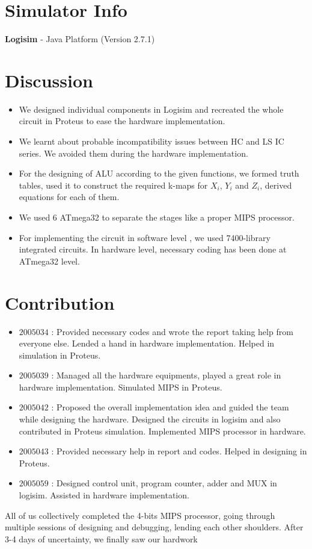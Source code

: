 \documentclass[a4paper]{article}
\begin{document}
\section{Simulator Info}
\textbf{Logisim} - Java Platform (Version 2.7.1)
\newpage
\section{Discussion}
\begin{itemize}
  \item We designed individual components in Logisim and recreated the whole circuit in Proteus to ease the hardware implementation.
  
  \item We learnt about probable incompatibility issues between HC and LS IC series. We avoided them during the hardware implementation.
  
  \item For the designing of ALU according to the given functions, we formed truth tables, used it to construct the required k-maps for $X_i$, $Y_i$ and $Z_i$, derived equations for each of them.

  \item We used 6 ATmega32 to separate the stages like a proper MIPS processor.
  \item For implementing the circuit in software level , we used 7400-library integrated circuits. In hardware level, necessary coding has been done at ATmega32 level.
  
\end{itemize}

\vspace{1cm}

\section{Contribution}
\begin{itemize}
    \item $2005034$ : Provided necessary codes and wrote the report taking help from everyone else. Lended a hand in hardware implementation. Helped in simulation in Proteus.
    
    \item $2005039$ : Managed all the hardware equipments, played a great role in hardware implementation. Simulated MIPS in Proteus.
    
    \item $2005042$ : Proposed the overall implementation idea and guided the team while designing the hardware. Designed the circuits in logisim and also contributed in Proteus simulation. Implemented MIPS processor in hardware.
    
    \item $2005043$ : Provided necessary help in report and codes. Helped in designing in Proteus.
    
    \item $2005059$ : Designed control unit, program counter, adder and MUX in logisim. Assisted in hardware implementation.
\end{itemize}


All of us collectively completed the 4-bits MIPS processor, going through multiple sessions of designing and debugging, lending each other shoulders. After 3-4 days of uncertainty, we finally saw our hardwork 
\end{document}
